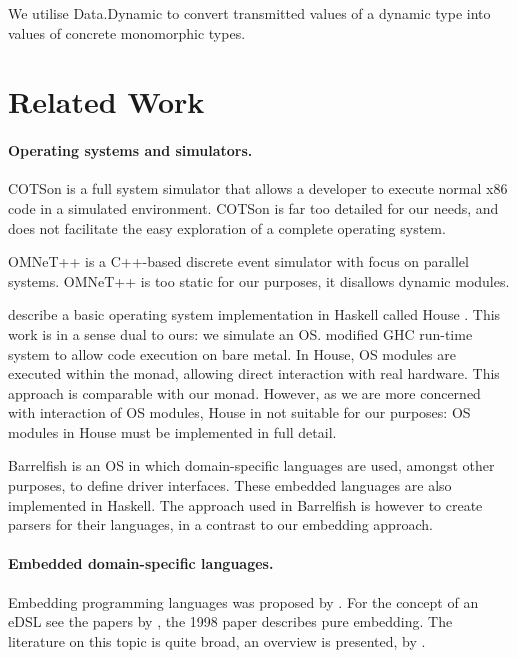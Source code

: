 We utilise \textsf{Data.Dynamic} to convert transmitted values of a
dynamic type into values of concrete monomorphic types.

\section{Related Work}
\label{sec:related-work}

\paragraph{Operating systems and simulators.}
COTSon \cite{cotson} is a full system simulator that allows a developer to execute normal x86 code in a simulated environment.
COTSon is far too detailed for our needs, and does not facilitate the easy exploration of a complete operating system.

OMNeT++ \cite{omnet} is a C++-based discrete event simulator with focus on parallel systems. OMNeT++ is too static for our purposes, it disallows dynamic modules.


\citeauthor{house} describe a basic operating system implementation in Haskell called House \cite{house}.
This work is in a sense dual to ours: we simulate an OS.
\citeauthor{house} modified GHC run-time system to allow code execution on bare metal.
In House, OS modules are executed within the  monad, allowing direct interaction with real hardware.
This approach is comparable with our  monad.
However, as we are more concerned with interaction of OS modules, House in not suitable for our purposes:  OS modules in House must be implemented in full detail.

Barrelfish \cite{barrelfish} is an OS in which domain-specific languages are used, amongst other purposes, to define driver interfaces.
These embedded languages are also implemented in Haskell.
The approach used in Barrelfish is however to create parsers for their languages, in a contrast to our embedding approach.


\paragraph{Embedded domain-specific languages.}
Embedding programming languages was proposed by \citeauthor{Landin:1966:NPL:365230.365257} \cite{Landin:1966:NPL:365230.365257}.
For the concept of an eDSL see the papers by \citeauthor{hudak1} \cite{hudak1,hudak2}, the 1998 paper describes pure embedding.
The literature on this topic is quite broad, an overview is presented, \eg by \citeauthor{dsl-survey} \cite{dsl-survey}.


